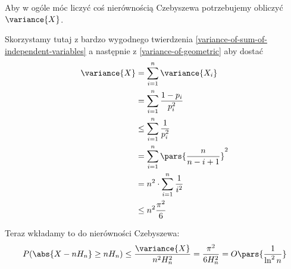 Aby w ogóle móc liczyć coś nierównością Czebyszewa potrzebujemy obliczyć \( \variance{X} \).

Skorzystamy tutaj z bardzo wygodnego twierdzenia \ref{variance-of-sum-of-independent-variables}
a następnie z
\ref{variance-of-geometric}
aby dostać
\begin{align*}
	\variance{X}
	 & = \sum_{i=1}^n \variance{X_i}          \\
	 & = \sum_{i=1}^n \frac{1 - p_i}{p_i^2}   \\
	 & \leq \sum_{i=1}^n \frac{1}{p_i^2}      \\
	 & =\sum_{i=1}^n \pars{\frac{n}{n-i+1}}^2 \\
	 & =n^2 \cdot \sum_{i=1}^n \frac{1}{i^2}  \\
	 & \leq n^2\frac{\pi^2}{6}
\end{align*}

Teraz wkładamy to do nierówności Czebyszewa:
\[
	P(\abs{X - nH_n} \geq nH_n) \leq \frac{\variance{X}}{n^2H_n^2} = \frac{\pi^2}{6H_n^2} = O\pars{\frac{1}{\ln^2 n}}
\]